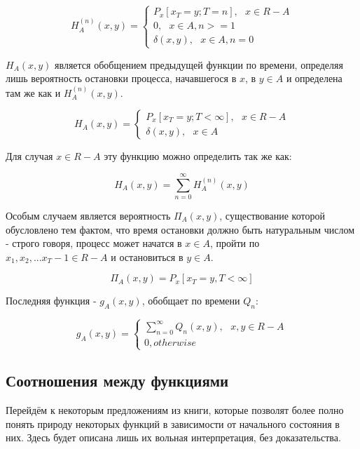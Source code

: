 \begin{equation}
H^{(n)}_A(x,y) = 
	\begin{cases}
		P_x[x_T=y; T=n], \ \ \ x \in R-A \\
		0, \ \ \ x \in A, n>=1 \\
		\delta(x,y), \ \ \ x \in A, n=0
	\end{cases}
\end{equation}

$H_A(x,y)$ является обобщением предыдущей функции по времени, определяя лишь вероятность остановки процесса, начавшегося в $x$, в $y \in A$ и определена там же как и $H^{(n)}_A(x,y)$.

\begin{equation}
H_A(x,y) = 
	\begin{cases}
		P_x[x_T=y; T < \infty], \ \ \ x \in R-A \\
		\delta(x,y), \ \ \ x \in A
	\end{cases}
\end{equation}

Для случая $x \in R-A$ эту функцию можно определить так же как:

\begin{equation}
H_A(x,y) = \sum^{\infty}_{n=0}H^{(n)}_A(x,y)
\end{equation}

Особым случаем является вероятность $\Pi_A(x,y)$, существование которой обусловлено тем фактом, что время остановки должно быть натуральным числом - строго говоря, процесс может начатся в $x \in A$, пройти по ${x_1, x_2,...x_T-1 \in R-A}$ и остановиться в $y \in A$.

\begin{equation}
\Pi_{A}(x,y) = P_x[x_T=y, T < \infty]
\end{equation}

Последняя функция - $g_A(x,y)$, обобщает  по времени $Q_n$:

\begin{equation}
g_A(x,y) = 
	\begin{cases}
		\sum^{\infty}_{n=0}Q_n(x,y), \ \ \ x, y \in R-A \\
		0, otherwise
	\end{cases}
\end{equation}

\subsection{Соотношения между функциями}

Перейдём к некоторым предложениям из книги, которые позволят более полно понять природу некоторых функций в зависимости от начального состояния в них. Здесь будет описана лишь их вольная интерпретация, без доказательства.

